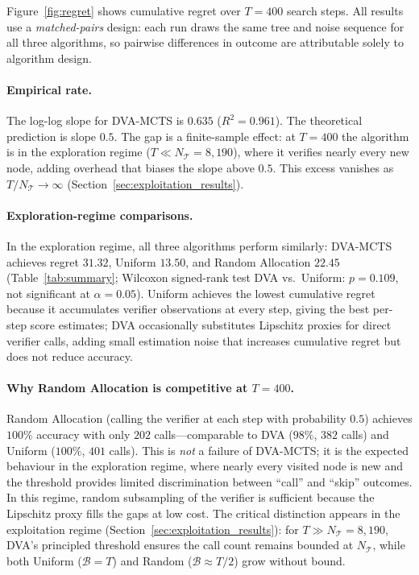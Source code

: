 Figure~\ref{fig:regret} shows cumulative regret over $T{=}400$ search steps.
All results use a \emph{matched-pairs} design: each run draws the same tree and
noise sequence for all three algorithms, so pairwise differences in outcome are
attributable solely to algorithm design.

\paragraph{Empirical rate.}
The log-log slope for DVA-MCTS is $\mathbf{0.635}$ ($R^2{=}0.961$). The theoretical
prediction is slope $0.5$. The gap is a finite-sample effect: at $T{=}400$ the
algorithm is in the exploration regime ($T \ll N_{\mathcal{T}}{=}8{,}190$), where it
verifies nearly every new node, adding overhead that biases the slope above $0.5$.
This excess vanishes as $T / N_{\mathcal{T}} \to \infty$ (Section~\ref{sec:exploitation_results}).

\paragraph{Exploration-regime comparisons.}
In the exploration regime, all three algorithms perform similarly:
DVA-MCTS achieves regret $31.32$, Uniform $13.50$, and Random Allocation $22.45$
(Table~\ref{tab:summary}; Wilcoxon signed-rank test DVA vs.\ Uniform: $p{=}0.109$,
not significant at $\alpha{=}0.05$). Uniform achieves the lowest cumulative regret
because it accumulates verifier observations at every step, giving the best
per-step score estimates; DVA occasionally substitutes Lipschitz proxies for
direct verifier calls, adding small estimation noise that increases cumulative
regret but does not reduce accuracy.

\paragraph{Why Random Allocation is competitive at $T{=}400$.}
Random Allocation (calling the verifier at each step with probability $0.5$)
achieves $100\%$ accuracy with only $202$ calls---comparable to DVA ($98\%$,
$382$ calls) and Uniform ($100\%$, $401$ calls). This is \emph{not} a failure of
DVA-MCTS; it is the expected behaviour in the exploration regime, where nearly
every visited node is new and the threshold provides limited discrimination
between ``call'' and ``skip'' outcomes. In this regime, random subsampling of
the verifier is sufficient because the Lipschitz proxy fills the gaps at
low cost. The critical distinction appears in the exploitation regime
(Section~\ref{sec:exploitation_results}): for $T \gg N_{\mathcal{T}} = 8{,}190$, DVA's
principled threshold ensures the call count remains bounded at $N_{\mathcal{T}}$,
while both Uniform ($\mathcal{B} = T$) and Random ($\mathcal{B} \approx T/2$)
grow without bound.

